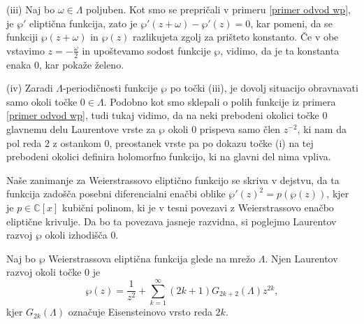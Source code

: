 \documentclass[mat1]{fmfdelo}
\newcommand{\C}{\mathbb C}
\newcommand{\om}{\omega}
\theoremstyle{definition}
\begin{document}
\begin{dokaz}
    (iii) Naj bo $\om\in \Lambda$ poljuben. Kot smo se prepričali v primeru \ref{primer odvod wp}, je $\wp'$ eliptična funkcija, zato je $\wp'(z + \om) - \wp'(z) = 0$, kar pomeni, da se funkciji $\wp(z + \om)$ in $\wp(z)$ razlikujeta zgolj za prišteto konstanto. Če v obe vstavimo $z = -\frac{\omega}{2}$ in upoštevamo sodost funkcije $\wp$, vidimo, da je ta konstanta enaka $0$, kar pokaže želeno.

    (iv) Zaradi $\Lambda$-periodičnosti funkcije $\wp$ po točki (iii), je dovolj situacijo obravnavati samo okoli točke $0\in\Lambda$. Podobno kot smo sklepali o polih funkcije iz primera \ref{primer odvod wp}, tudi tukaj vidimo, da na neki prebodeni okolici točke $0$ glavnemu delu Laurentove vrste za $\wp$ okoli $0$ prispeva samo člen $z^{-2}$, ki nam da pol reda $2$ z ostankom $0$, preostanek vrste pa po dokazu točke (i) na tej prebodeni okolici definira holomorfno funkcijo, ki na glavni del nima vpliva.  
\end{dokaz}

Naše zanimanje za Weierstrassovo eliptično funkcijo se skriva v dejstvu, da ta funkcija zadošča posebni diferencialni enačbi oblike $\wp'(z)^2 = p(\wp(z))$, kjer je $p \in \C[x]$ kubični polinom, ki je v tesni povezavi z Weierstrassovo enačbo eliptične krivulje. Da bo ta povezava jasneje razvidna, si poglejmo Laurentov razvoj $\wp$ okoli izhodišča $0$. 

\begin{lema}
    Naj bo $\wp$ Weierstrassova eliptična funkcija glede na mrežo $\Lambda$. Njen Laurentov razvoj okoli točke $0$ je
    \[
        \wp(z) = \frac{1}{z^2} + \sum_{k = 1}^\infty(2k + 1)G_{2k + 2}(\Lambda)z^{2k},  
    \]
    kjer $G_{2k}(\Lambda)$ označuje Eisensteinovo vrsto reda $2k$.
\end{lema}
\end{document}
